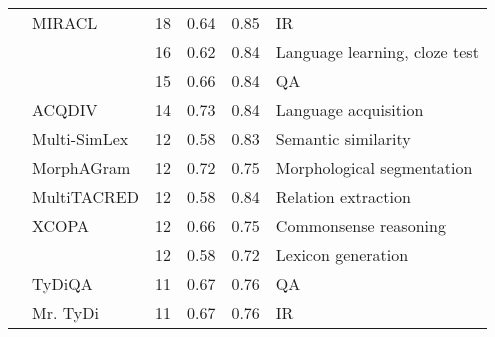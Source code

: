 \begin{tabular}{llrlll}
	\citet{zhang-etal-2023-miracl}                & MIRACL                 & 18                              & 0.64                          & 0.85                          & IR                                  \\
	\citet{palma-gomez-etal-2023-using}           &                        & 16                              & 0.62\lowcov                   & 0.84                          & Language learning, cloze test       \\
	\citet{asai-etal-2022-mia}                    &                        & 15                              & 0.66                          & 0.84                          & QA                                  \\
	\citet{jancso-etal-2020-acqdiv}               & ACQDIV                 & 14                              & 0.73\lowcov                   & 0.84                          & Language acquisition                \\
	\citet{vulic-etal-2020-multi}                 & Multi-SimLex           & 12                              & 0.58                          & 0.83                          & Semantic similarity                 \\
	\citet{eskander-etal-2020-morphagram}         & MorphAGram             & 12                              & 0.72\lowcov                   & 0.75                          & Morphological segmentation          \\
	\citet{hennig-etal-2023-multitacred}          & MultiTACRED            & 12                              & 0.58                          & 0.84                          & Relation extraction                 \\
	\citet{ponti-etal-2020-xcopa}                 & XCOPA                  & 12                              & 0.66                          & 0.75\missing                  & Commonsense reasoning               \\
	\citet{buechel-etal-2020-learning-evaluating} &                        & 12                              & 0.58                          & 0.72                          & Lexicon generation                  \\
	\citet{clark-etal-2020-tydi}                  & TyDiQA                 & 11                              & 0.67                          & 0.76                          & QA                                  \\
	\citet{zhang-etal-2021-mr}                    & Mr. TyDi               & 11                              & 0.67                          & 0.76                          & IR                                  \\

\end{tabular}
